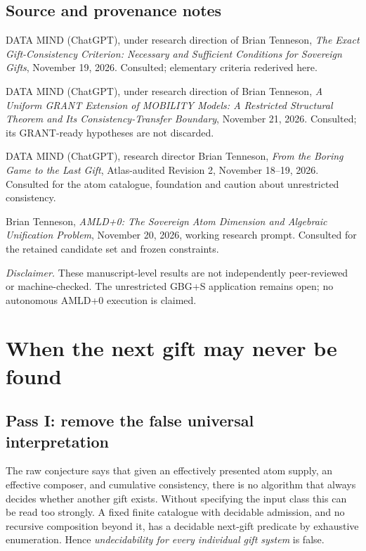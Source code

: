 \documentclass[11pt,letterpaper]{article}
\theoremstyle{definition}\newtheorem{definition}[theorem]{Definition}\newtheorem{example}[theorem]{Example}
\theoremstyle{remark}\newtheorem{remark}[theorem]{Remark}
\begin{document}
\subsection*{Source and provenance notes}
\begin{enumerate}[label={[\arabic*]},leftmargin=2.4em]
\item DATA MIND (ChatGPT), under research direction of Brian Tenneson, \emph{The Exact Gift-Consistency Criterion: Necessary and Sufficient Conditions for Sovereign Gifts}, November 19, 2026. Consulted; elementary criteria rederived here.
\item DATA MIND (ChatGPT), under research direction of Brian Tenneson, \emph{A Uniform GRANT Extension of MOBILITY Models: A Restricted Structural Theorem and Its Consistency-Transfer Boundary}, November 21, 2026. Consulted; its GRANT-ready hypotheses are not discarded.
\item DATA MIND (ChatGPT), research director Brian Tenneson, \emph{From the Boring Game to the Last Gift}, Atlas-audited Revision 2, November 18--19, 2026. Consulted for the atom catalogue, foundation and caution about unrestricted consistency.
\item Brian Tenneson, \emph{AMLD+0: The Sovereign Atom Dimension and Algebraic Unification Problem}, November 20, 2026, working research prompt. Consulted for the retained candidate set and frozen constraints.
\end{enumerate}
\vspace{0.5em}
\noindent\textit{Disclaimer.} These manuscript-level results are not independently peer-reviewed or machine-checked. The unrestricted GBG+S application remains open; no autonomous AMLD+0 execution is claimed.


\section{When the next gift may never be found}
\subsection{Pass I: remove the false universal interpretation}
The raw conjecture says that given an effectively presented atom supply, an effective composer, and cumulative consistency, there is no algorithm that always decides whether another gift exists. Without specifying the input class this can be read too strongly. A fixed finite catalogue with decidable admission, and no recursive composition beyond it, has a decidable next-gift predicate by exhaustive enumeration. Hence \emph{undecidability for every individual gift system} is false.
\end{document}
